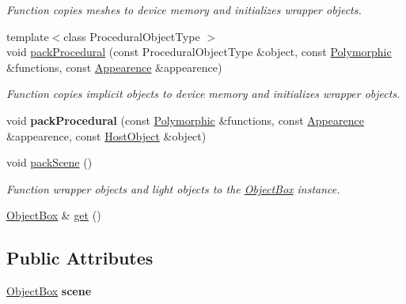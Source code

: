 \begin{DoxyCompactItemize}
\begin{DoxyCompactList}\small\item\em Function copies meshes to device memory and initializes wrapper objects. \end{DoxyCompactList}\item 
{\footnotesize template$<$class Procedural\+Object\+Type $>$ }\\void \hyperlink{class_geometry_loader_a175f8a4496b0b4d183f8eba7a2ac38f9}{pack\+Procedural} (const Procedural\+Object\+Type \&object, const \hyperlink{struct_polymorphic}{Polymorphic} \&functions, const \hyperlink{struct_appearence}{Appearence} \&appearence)
\begin{DoxyCompactList}\small\item\em Function copies implicit objects to device memory and initializes wrapper objects. \end{DoxyCompactList}\item 
void {\bfseries pack\+Procedural} (const \hyperlink{struct_polymorphic}{Polymorphic} \&functions, const \hyperlink{struct_appearence}{Appearence} \&appearence, const \hyperlink{class_host_object}{Host\+Object} \&object)\hypertarget{class_geometry_loader_a1d2eddd9fd6dfd98435ca4c2d618449e}{}\label{class_geometry_loader_a1d2eddd9fd6dfd98435ca4c2d618449e}

\item 
void \hyperlink{class_geometry_loader_a11a589427dc744b17ccc5085ec07a338}{pack\+Scene} ()\hypertarget{class_geometry_loader_a11a589427dc744b17ccc5085ec07a338}{}\label{class_geometry_loader_a11a589427dc744b17ccc5085ec07a338}

\begin{DoxyCompactList}\small\item\em Function wrapper objects and light objects to the \hyperlink{class_object_box}{Object\+Box} instance. \end{DoxyCompactList}\item 
\hyperlink{class_object_box}{Object\+Box} \& \hyperlink{class_geometry_loader_af3716f894c24e1662ffbbd48e0575bcd}{get} ()
\end{DoxyCompactItemize}
\subsection*{Public Attributes}
\begin{DoxyCompactItemize}
\item 
\hyperlink{class_object_box}{Object\+Box} {\bfseries scene}\hypertarget{class_geometry_loader_a3e040be4450444adddd72735905cb38e}{}\label{class_geometry_loader_a3e040be4450444adddd72735905cb38e}

\end{DoxyCompactItemize}


